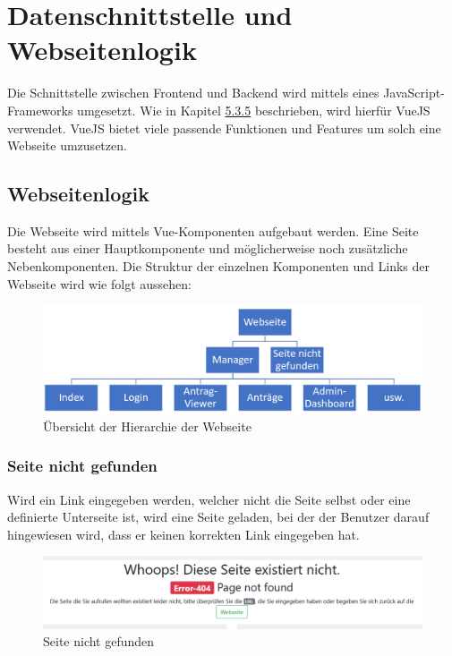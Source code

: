 \section{Datenschnittstelle und Webseitenlogik}
Die Schnittstelle zwischen Frontend und Backend wird mittels eines JavaScript-Frameworks umgesetzt. Wie in Kapitel \hyperref[sec:rfoster_fazit]{5.3.5} beschrieben, wird hierfür VueJS verwendet. VueJS bietet viele passende Funktionen und Features um solch eine Webseite umzusetzen.
\subsection{Webseitenlogik}
\label{sec:webseitenlogik}
Die Webseite wird mittels Vue-Komponenten aufgebaut werden. Eine Seite besteht aus einer Hauptkomponente und möglicherweise noch zusätzliche Nebenkomponenten. Die Struktur der einzelnen Komponenten und Links der Webseite wird wie folgt aussehen:
\begin{figure}[H]
	\centering
	\includegraphics[width=0.8\linewidth]{images/Webseite_hierarchie}
	\caption[Hierarchie der Webseite]{Übersicht der Hierarchie der Webseite}
	\label{fig:webseitehierachie}
\end{figure}

\subsubsection{Seite nicht gefunden}
\label{sec:not_found}
Wird ein Link eingegeben werden, welcher nicht die Seite selbst oder eine definierte Unterseite ist, wird eine Seite geladen, bei der der Benutzer darauf hingewiesen wird, dass er keinen korrekten Link eingegeben hat.
\begin{figure}[H]
	\centering
	\includegraphics[width=0.6\linewidth]{images/page_not_found}
	\caption[Seite nicht gefunden]{Seite nicht gefunden}
	\label{fig:pagenotfound}
\end{figure}

